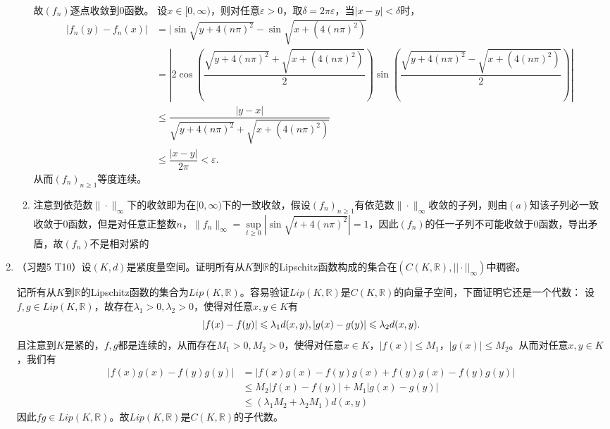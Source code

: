 \begin{enumerate}
\begin{answer}
\begin{enumerate}
        故$(f_n)$逐点收敛到0函数。 
        设$x\in[0,\infty)$，则对任意$\varepsilon>0$，取$\delta=2\pi\varepsilon$，当$|x-y|<\delta$时，
        \[\begin{aligned}
          |f_n(y)-f_n(x)|&=|\sin\sqrt{y+4(n\pi)^2}-\sin\sqrt{x+(4(n\pi)^2)}\\
                        &=|2\cos(\dfrac{\sqrt{y+4(n\pi)^2}+\sqrt{x+(4(n\pi)^2)}}{2})\sin(\dfrac{\sqrt{y+4(n\pi)^2}-\sqrt{x+(4(n\pi)^2)}}{2})|\\
                        &\leqslant\dfrac{|y-x|}{\sqrt{y+4(n\pi)^2}+\sqrt{x+(4(n\pi)^2)}}\\
                          &\leqslant \dfrac{|x-y|}{2\pi}<\varepsilon.	              
        \end{aligned}\]
        从而$(f_n)_{n\geqslant 1}$等度连续。 
        \item 注意到依范数$\|\cdot\|_\infty$下的收敛即为在$[0,\infty)$下的一致收敛，假设$(f_n)_{n\geqslant1}$有依范数$\|\cdot\|_\infty$收敛的子列，则由$(a)$知该子列必一致收敛于0函数，但是对任意正整数$n$，$\|f_n\|_\infty=\sup\limits_{t\geqslant0}|\sin\sqrt{t+4(n\pi)^2}|=1$，因此$(f_n)$的任一子列不可能收敛于0函数，导出矛盾，故$(f_n)$不是相对紧的
      \end{enumerate}
    \end{answer}
  \item （习题5 T10）设$(K,d)$是紧度量空间。证明所有从$K$到$\mathbb{R}$的Lipschitz函数构成的集合在$(C(K,\mathbb{R}),||\cdot||_{\infty})$中稠密。 
    \begin{answer}
      记所有从$K$到$\mathbb{R}$的Lipschitz函数的集合为$Lip(K,\mathbb{R})$。容易验证$Lip(K,\mathbb{R})$是$C(K,\mathbb{R})$的向量子空间，下面证明它还是一个代数： 
      设$f,g\in Lip(K,\mathbb{R})$，故存在$\lambda_1>0,\lambda_2>0$，使得对任意$x,y\in K$有
      \[ |f(x)-f(y)|\leqslant \lambda_1 d(x,y),\\
      |g(x)-g(y)|\leqslant \lambda_2 d(x,y). \]且注意到$K$是紧的，$f,g$都是连续的，从而存在$M_1>0,M_2>0$，使得对任意$x\in K$，$|f(x)|\leqslant M_1$，$|g(x)|\leqslant M_2$。从而对任意$x,y\in K$，我们有
      \[\begin{aligned} 
        |f(x)g(x)-f(y)g(y)|&=|f(x)g(x)-f(y)g(x)+f(y)g(x)-f(y)g(y)|\\
                          &\leqslant M_2 |f(x)-f(y)|+M_1 |g(x)-g(y)|\\
                          &\leqslant (\lambda_1 M_2+\lambda_2 M_1)d(x,y)
      \end{aligned}\]
      因此$fg\in Lip(K,\mathbb{R})$。故$Lip(K,\mathbb{R})$是$C(K,\mathbb{R})$的子代数。 

\end{answer}
\end{enumerate}
